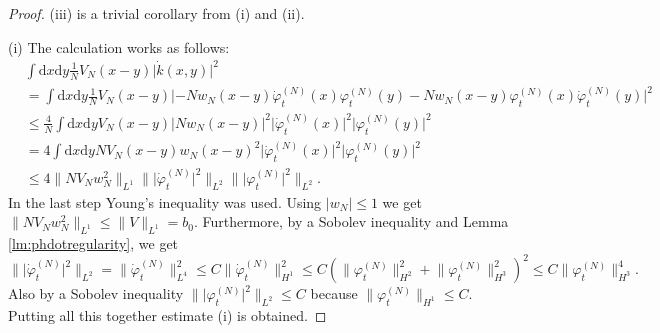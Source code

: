 \documentclass[11pt,a4paper,draft,DIV11]{scrartcl}	%
\newcommand{\di}{\textrm{d}}		%
\newcommand{\norm}[1]{\lVert#1\rVert}	%
\newcommand{\ph}{\varphi_t^{(N)}}	%
\newcommand{\phdot}{\dot{\varphi}_t^{(N)}}	%
\newcommand{\bd}{\begin{displaymath}}			%
\newcommand{\ed}{\end{displaymath}}
\begin{document}
\begin{proof} (iii) is a trivial corollary from (i) and (ii).

(i) The calculation works as follows:
\begin{align*}
& \int \di x\di y \frac{1}{N}V_N(x-y) \lvert \dot k(x,y)\rvert^2 \\
& = \int \di x\di y \frac{1}{N} V_N(x-y) \lvert -N w_N(x-y) \phdot(x) \ph(y) - N w_N(x-y) \ph(x) \phdot(y)\rvert^2 \\
& \leq \frac{4}{N} \int \di x\di y V_N(x-y) \lvert N w_N(x-y) \rvert^2 \lvert \phdot(x)\rvert^2 \lvert \ph(y)\rvert^2 \\
& = 4 \int \di x \di y NV_N(x-y) w_N(x-y)^2 \lvert \phdot(x)\rvert^2 \lvert \ph(y)\rvert^2 \\
& \leq 4 \norm{N V_N w_N^2}_{L^1} \norm{\lvert\phdot\rvert^2}_{L^2} \norm{\lvert \ph\rvert^2}_{L^2}.
\end{align*}
In the last step Young's inequality was used. Using $\lvert w_N\rvert \leq 1$ we get $\norm{N V_N w_N^2}_{L^1} \leq \norm{V}_{L^1} = b_0$.
Furthermore, by a Sobolev inequality and Lemma \ref{lm:phdotregularity}, we get
\bd
\norm{\lvert \phdot\rvert^2}_{L^2} = \norm{\phdot}_{L^4}^2 \leq C \norm{\phdot}_{H^1}^2 \leq C(\norm{\ph}_{H^2}^2 + \norm{\ph}_{H^3}^2)^2 \leq C \norm{\ph}_{H^3}^4.
\ed
Also by a Sobolev inequality $\norm{\lvert \ph\rvert^2}_{L^2} \leq C$ because $\norm{\ph}_{H^1} \leq C$. Putting all this together estimate (i) is obtained.


\end{proof}
\end{document}
